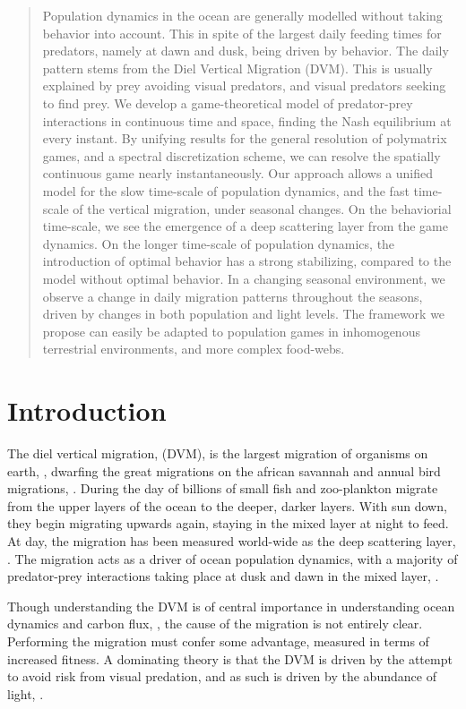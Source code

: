 \begin{abstract}

  Population dynamics in the ocean are generally modelled without taking behavior into account. This in spite of the largest daily feeding times for predators, namely at dawn and dusk, being driven by behavior. The daily pattern stems from the Diel Vertical Migration (DVM). This is usually explained by prey avoiding visual predators, and visual predators seeking to find prey. We develop a game-theoretical model of predator-prey interactions in continuous time and space, finding the Nash equilibrium at every instant. By unifying results for the general resolution of polymatrix games, and a spectral discretization scheme, we can resolve the spatially continuous game nearly instantaneously. Our approach allows a unified model for the slow time-scale of population dynamics, and the fast time-scale of the vertical migration, under seasonal changes.
  On the behaviorial time-scale, we see the emergence of a deep scattering layer from the game dynamics. On the longer time-scale of population dynamics, the introduction of optimal behavior has a strong stabilizing, compared to the model without optimal behavior. In a changing seasonal environment, we observe a change in daily migration patterns throughout the seasons, driven by changes in both population and light levels. The framework we propose can easily be adapted to population games in inhomogenous terrestrial environments, and more complex food-webs.
\end{abstract}
\section{Introduction}

The diel vertical migration, (DVM), is the largest migration of organisms on earth, \citep{}, dwarfing the great migrations on the african savannah and annual bird migrations, \citep{}. During the day of billions of small fish and zoo-plankton migrate from the upper layers of the ocean to the deeper, darker layers. With sun down, they begin migrating upwards again, staying in the mixed layer at night to feed. At day, the migration has been measured world-wide as the deep scattering layer, \citep{}. The migration acts as a driver of ocean population dynamics, with a majority of predator-prey interactions taking place at dusk and dawn in the mixed layer, \citep{}.


Though understanding the DVM is of central importance in understanding ocean dynamics and carbon flux, \citep{}, the cause of the migration is not entirely clear. Performing the migration must confer some advantage, measured in terms of increased fitness. A dominating theory is that the DVM is driven by the attempt to avoid risk from visual predation, and as such is driven by the abundance of light, \citep{}.


